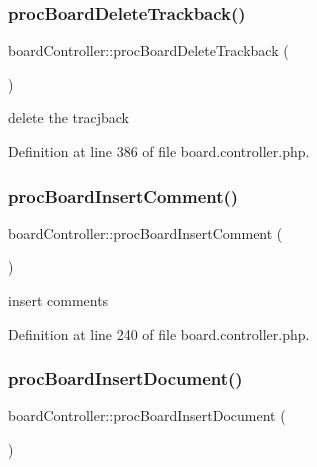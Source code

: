 \subsubsection{\texorpdfstring{proc\+Board\+Delete\+Trackback()}{procBoardDeleteTrackback()}}
{\footnotesize\ttfamily board\+Controller\+::proc\+Board\+Delete\+Trackback (\begin{DoxyParamCaption}{ }\end{DoxyParamCaption})}



delete the tracjback 



Definition at line 386 of file board.\+controller.\+php.

\mbox{\label{classboardController_ab643a9d4d386833e92bc2d7114319fb2}} 
\subsubsection{\texorpdfstring{proc\+Board\+Insert\+Comment()}{procBoardInsertComment()}}
{\footnotesize\ttfamily board\+Controller\+::proc\+Board\+Insert\+Comment (\begin{DoxyParamCaption}{ }\end{DoxyParamCaption})}



insert comments 



Definition at line 240 of file board.\+controller.\+php.

\mbox{\label{classboardController_a14ee978c5be08ee33f4c00a6960c4e60}} 
\subsubsection{\texorpdfstring{proc\+Board\+Insert\+Document()}{procBoardInsertDocument()}}
{\footnotesize\ttfamily board\+Controller\+::proc\+Board\+Insert\+Document (\begin{DoxyParamCaption}{ }\end{DoxyParamCaption})}



